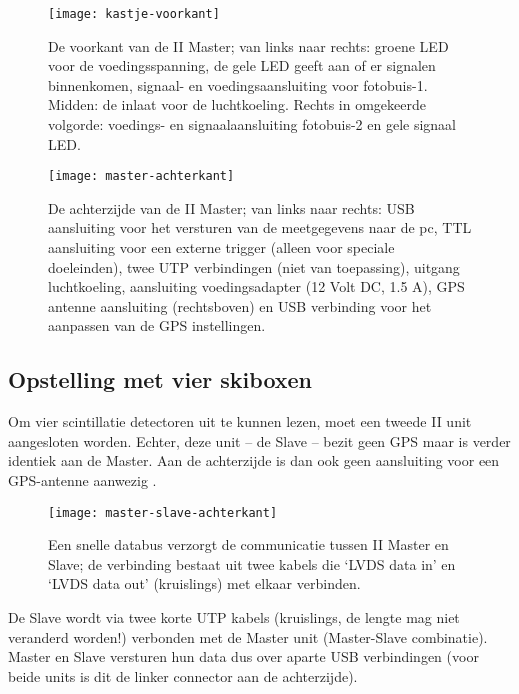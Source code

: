 \begin{figure}
    \centering
    \texttt{[image: kastje-voorkant]}
    \caption{De voorkant van de \hisparc II Master; van links naar
    rechts: groene LED voor de voedingsspanning, de gele LED geeft aan
    of er signalen binnenkomen, signaal- en voedingsaansluiting voor
    fotobuis-1. Midden: de inlaat voor de luchtkoeling. Rechts in
    omgekeerde volgorde: voedings- en signaalaansluiting fotobuis-2 en
    gele signaal LED.}
    \label{fig:kastje-voorkant}
\end{figure}

\begin{figure}
    \centering
    \texttt{[image: master-achterkant]}
    \caption{De achterzijde van de \hisparc II Master; van links naar
    rechts: USB aansluiting voor het versturen van de meetgegevens naar
    de pc, TTL aansluiting voor een externe trigger (alleen voor
    speciale doeleinden), twee UTP verbindingen (niet van toepassing),
    uitgang luchtkoeling, aansluiting voedingsadapter (12 Volt DC, 1.5
    A), GPS antenne aansluiting (rechtsboven) en USB verbinding voor het
    aanpassen van de GPS instellingen.}
    \label{fig:master-achterkant}
\end{figure}

\subsection{Opstelling met vier skiboxen}

Om vier scintillatie detectoren uit te kunnen lezen, moet een tweede
\hisparc II unit aangesloten worden. Echter, deze unit – de Slave –
 bezit geen GPS maar is verder identiek aan de
Master. Aan de achterzijde is dan ook geen aansluiting voor een
GPS-antenne aanwezig . 

\begin{figure}
    \centering
    \texttt{[image: master-slave-achterkant]}
    \caption{Een snelle databus verzorgt de communicatie tussen \hisparc
    II Master en Slave; de verbinding bestaat uit twee kabels die ‘LVDS
    data in’ en ‘LVDS data out’ (kruislings) met elkaar verbinden.}
    \label{fig:master-slave-achterkant}
\end{figure}

De Slave wordt via twee korte UTP kabels (kruislings, de lengte mag niet
veranderd worden!) verbonden met de Master unit (Master-Slave
combinatie). Master en Slave versturen hun data dus over aparte USB
verbindingen (voor beide units is dit de linker connector aan de
achterzijde). 



